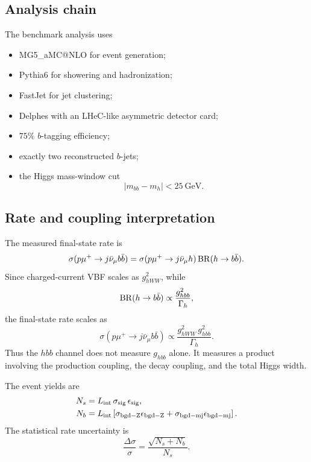 \documentclass[11pt,a4paper]{article}
\newcommand{\gev}{\ensuremath{~\mathrm{GeV}}}
\begin{document}
\subsection{Analysis chain}

The benchmark analysis uses
\begin{itemize}[leftmargin=*]
  \item MG5\_aMC@NLO for event generation;
  \item Pythia6 for showering and hadronization;
  \item FastJet for jet clustering;
  \item Delphes with an LHeC-like asymmetric detector card;
  \item \(75\%\) \(b\)-tagging efficiency;
  \item exactly two reconstructed \(b\)-jets;
  \item the Higgs mass-window cut
  \begin{equation}
    |m_{bb}-m_h|<25\gev.
  \end{equation}
\end{itemize}



\subsection{Rate and coupling interpretation}

The measured final-state rate is
\begin{equation}
  \sigma(p\mu^+\to j\bar\nu_\mu b\bar b)
  =
  \sigma(p\mu^+\to j\bar\nu_\mu h)\,
  {\rm BR}(h\to b\bar b).
\end{equation}
Since charged-current VBF scales as \(g_{hWW}^2\), while
\[
  {\rm BR}(h\to b\bar b)\propto \frac{g_{hbb}^2}{\Gamma_h},
\]
the final-state rate scales as
\begin{equation}
  \sigma(p\mu^+\to j\bar\nu_\mu b\bar b)
  \propto
  \frac{g_{hWW}^2\,g_{hbb}^2}{\Gamma_h}.
  \label{eq:hbb_rate}
\end{equation}
Thus the \(hbb\) channel does not measure \(g_{hbb}\) alone.  It measures a product involving
the production coupling, the decay coupling, and the total Higgs width.

The event yields are
\begin{align}
  N_s &= L_{\rm int}\,\sigma_{\rm sig}\,\epsilon_{\rm sig},\\
  N_b &= L_{\rm int}\left[
    \sigma_{\rm bgd-Z}\epsilon_{\rm bgd-Z}
    +
    \sigma_{\rm bgd-mj}\epsilon_{\rm bgd-mj}
  \right].
\end{align}
The statistical rate uncertainty is
\begin{equation}
  \frac{\Delta\sigma}{\sigma}
  =
  \frac{\sqrt{N_s+N_b}}{N_s}.
  \label{eq:rate_unc}
\end{equation}
\end{document}
